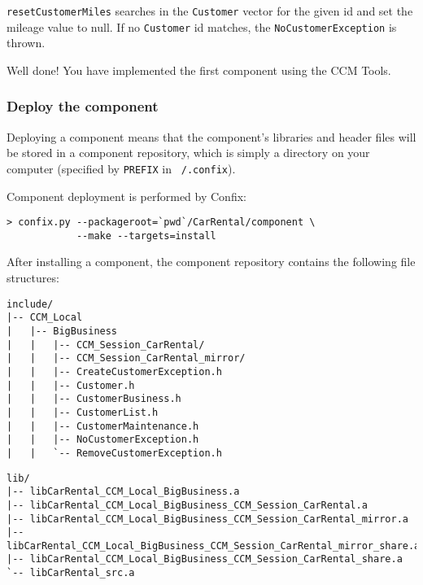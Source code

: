 {\tt resetCustomerMiles} searches in the {\tt Customer}
vector for the given id and set the mileage value to null.
If no {\tt Customer} id matches, the {\tt NoCustomerException} is thrown.

Well done! You have implemented the first component using the CCM Tools.


\subsubsection{Deploy the component}

Deploying a component means that the component's libraries and header files 
will be stored in a component repository, which is simply a directory on your 
computer (specified by {\tt PREFIX} in {\tt ~/.confix}).

Component deployment is performed by Confix:
\begin{small}
\begin{verbatim}
> confix.py --packageroot=`pwd`/CarRental/component \
            --make --targets=install
\end{verbatim}
\end{small}

After installing a component, the component repository contains the following
file structures:
\begin{small}
\begin{verbatim}
include/
|-- CCM_Local
|   |-- BigBusiness
|   |   |-- CCM_Session_CarRental/
|   |   |-- CCM_Session_CarRental_mirror/
|   |   |-- CreateCustomerException.h
|   |   |-- Customer.h
|   |   |-- CustomerBusiness.h
|   |   |-- CustomerList.h
|   |   |-- CustomerMaintenance.h
|   |   |-- NoCustomerException.h
|   |   `-- RemoveCustomerException.h
\end{verbatim}
\end{small}

\begin{small}
\begin{verbatim}
lib/
|-- libCarRental_CCM_Local_BigBusiness.a
|-- libCarRental_CCM_Local_BigBusiness_CCM_Session_CarRental.a
|-- libCarRental_CCM_Local_BigBusiness_CCM_Session_CarRental_mirror.a
|-- libCarRental_CCM_Local_BigBusiness_CCM_Session_CarRental_mirror_share.a
|-- libCarRental_CCM_Local_BigBusiness_CCM_Session_CarRental_share.a
`-- libCarRental_src.a
\end{verbatim}
\end{small}







